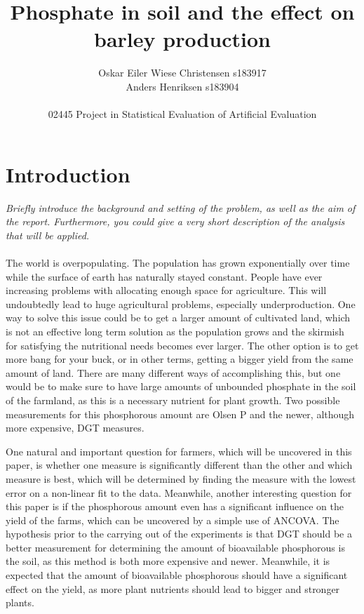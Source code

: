\documentclass[11pt, fleqn, titlepage]{article}
\title{Phosphate in soil and the effect on barley production}
\author{Oskar Eiler Wiese Christensen s183917 \\ Anders Henriksen s183904 \\ \\ 02445 Project in Statistical Evaluation of Artificial Evaluation}
\date{\today \vspace{2.5cm} \section*{\small Summary} 
\justify{\small Farmers will need more effective agriculture as the population grows. This can be accomplished by optimizing the amount of bioavailable phosphorous in the soil. The purpose of this paper is to analyze if more phosphorous leads to more yield and which measure, Olsen P or DGT, is best for getting the biggest possible yield. A linear and non-linear Michaelis-Mentel model have been fit to the data to find the best possible measurement to use, and ANCOVA has been applied for finding the significance of phosphorous for the yield. These analyses have shown that DGT is the best of the two measurements and that phosphorous has a remarkably significant influence on the harvest yield. This shows that phosphorous measurements can be constructive in helping farmers estimate the yield. Meanwhile, when estimating this, DGT is the better of the measurements, though it also costs more, so farmers should take into consideration the cost-benefit of using DGT instead of Olsen P.}}
\begin{document}
\maketitle

\section{Introduction}
\textit{Briefly introduce the background and setting of the problem, as well as the aim of the report. Furthermore, you could give a very short description of the analysis that will be applied.} \\ \\
The world is overpopulating. The population has grown exponentially over time while the surface of earth has naturally stayed constant. People have ever increasing problems with allocating enough space for agriculture. This will undoubtedly lead to huge agricultural problems, especially underproduction. One way to solve this issue could be to get a larger amount of cultivated land, which is not an effective long term solution as the population grows and the skirmish for satisfying the nutritional needs becomes ever larger. The other option is to get more bang for your buck, or in other terms, getting a bigger yield from the same amount of land. There are many different ways of accomplishing this, but one would be to make sure to have large amounts of unbounded phosphate in the soil of the farmland, as this is a necessary nutrient for plant growth. Two possible measurements for this phosphorous amount are Olsen P and the newer, although more expensive, DGT measures. 

One natural and important question for farmers, which will be uncovered in this paper, is whether one measure is significantly different than the other and which measure is best, which will be determined by finding the measure with the lowest error on a non-linear fit to the data. Meanwhile, another interesting question for this paper is if the phosphorous amount even has a significant influence on the yield of the farms, which can be uncovered by a simple use of ANCOVA. The hypothesis prior to the carrying out of the experiments is that DGT should be a better measurement for determining the amount of bioavailable phosphorous is the soil, as this method is both more expensive and newer. Meanwhile, it is expected that the amount of bioavailable phosphorous should have a significant effect on the yield, as more plant nutrients should lead to bigger and stronger plants.
\end{document}
